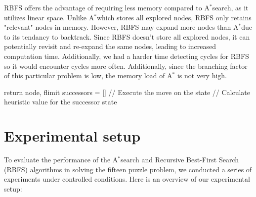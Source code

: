 \documentclass{article}
\begin{document}
RBFS offers the advantage of requiring less memory compared to A$^*$search, as it utilizes linear space. Unlike A$^*$which stores all explored nodes, RBFS only retains "relevant" nodes in memory. However, RBFS may expand more nodes than A$^*$due to its tendancy to backtrack. Since RBFS doesn't store all explored nodes, it can potentially revisit and re-expand the same nodes, leading to increased computation time. Additionally, we had a harder time detecting cycles for RBFS so it would encounter cycles more often. Additionally, since the branching factor of this particular problem is low, the memory load of A$^*$ is not very high.
\begin{algorithm}
   \begin{algorithmic}
  \State return node, flimit
        \EndIf
        \State successors = []
             // Execute the move on the state
             // Calculate heuristic value for the successor state
            \EndIf
            \EndFor
        \EndIf

            \EndIf
            \EndIf
          \EndWhile
          \end{algorithmic}
  \label{alg:RBFS}
\end{algorithm}

\section{Experimental setup}

To evaluate the performance of the A$^*$search and Recursive Best-First Search (RBFS) algorithms in solving the fifteen puzzle problem, we conducted a series of experiments under controlled conditions. Here is an overview of our experimental setup:
\end{document}
